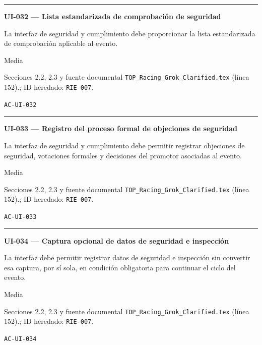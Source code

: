 \documentclass[10pt,letterpaper]{article}
\begin{document}
\vspace{0.25em}\hrule\vspace{0.65em}
\noindent\textbf{UI-032 --- Lista estandarizada de comprobación de seguridad}\par
\begin{description}[style=nextline,leftmargin=3.15cm,labelwidth=2.8cm,font=\normalfont\bfseries]
\item[Obligación] La interfaz de seguridad y cumplimiento debe proporcionar la lista estandarizada de comprobación aplicable al evento.
\item[Prioridad] Media
\item[Procedencia] Secciones 2.2, 2.3 y fuente documental \texttt{TOP\_Racing\_Grok\_Clarified.tex} (línea 152).; ID heredado: \texttt{RIE-007}.
\item[Verificación] \texttt{AC-UI-032}
\end{description}
\vspace{0.25em}\hrule\vspace{0.65em}
\noindent\textbf{UI-033 --- Registro del proceso formal de objeciones de seguridad}\par
\begin{description}[style=nextline,leftmargin=3.15cm,labelwidth=2.8cm,font=\normalfont\bfseries]
\item[Obligación] La interfaz de seguridad y cumplimiento debe permitir registrar objeciones de seguridad, votaciones formales y decisiones del promotor asociadas al evento.
\item[Prioridad] Media
\item[Procedencia] Secciones 2.2, 2.3 y fuente documental \texttt{TOP\_Racing\_Grok\_Clarified.tex} (línea 152).; ID heredado: \texttt{RIE-007}.
\item[Verificación] \texttt{AC-UI-033}
\end{description}
\vspace{0.25em}\hrule\vspace{0.65em}
\noindent\textbf{UI-034 --- Captura opcional de datos de seguridad e inspección}\par
\begin{description}[style=nextline,leftmargin=3.15cm,labelwidth=2.8cm,font=\normalfont\bfseries]
\item[Obligación] La interfaz debe permitir registrar datos de seguridad e inspección sin convertir esa captura, por sí sola, en condición obligatoria para continuar el ciclo del evento.
\item[Prioridad] Media
\item[Procedencia] Secciones 2.2, 2.3 y fuente documental \texttt{TOP\_Racing\_Grok\_Clarified.tex} (línea 152).; ID heredado: \texttt{RIE-007}.
\item[Verificación] \texttt{AC-UI-034}
\end{description}
\end{document}

